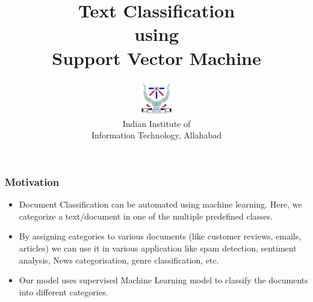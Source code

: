 \documentclass{beamer}
\date[]{}
\newcommand\tab[1][1cm]{\hspace*{#1}}
\begin{document}
\title{Text Classification\\ using\\ Support Vector Machine}
\author{\includegraphics[width=1.5cm]{logo.png}\\[.0cm]  Indian Institute of \\Information Technology, Allahabad}

\begin{frame}
\titlepage %
\end{frame}


\begin{frame}
\frametitle{\tab \tab \tab \tab \quad \huge Motivation}
\begin{itemize}
\item Document Classification can be automated using machine learning.
Here, we categorize a text/document in one of the multiple
predefined classes.\\
\item By assigning categories to various documents (like customer
reviews, emails, articles) we can use it in various application like
spam detection, sentiment analysis, News categorisation, genre
classification, etc. \\
\item Our model uses supervised Machine Learning model to classify the
documents into different categories. \\
\end{itemize}
\end{frame}
\end{document}

